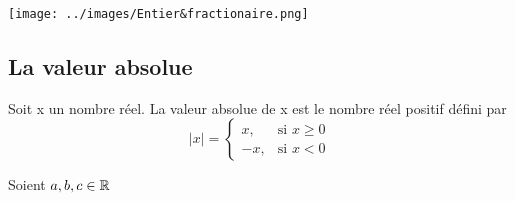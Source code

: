 \documentclass[a4paper, 12pt]{article}
\begin{document}


\texttt{[image: ../images/Entier\&fractionaire.png]}

\subsection{La valeur absolue}

\begin{definition}
    Soit x un nombre réel. La valeur absolue de x est le nombre réel positif défini par
    \begin{equation}
        |x| =
        \begin{cases}
            x, & \text{si } x \geq 0 \\
            -x, & \text{si } x \lt 0
        \end{cases}
    \end{equation}
\end{definition}


\noindent
Soient $a, b, c \in \mathbb{R}$
\end{document}
